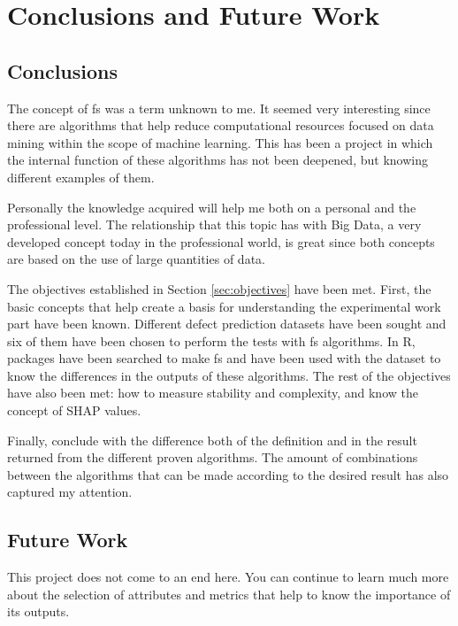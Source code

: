 \chapter{Conclusions and Future Work}
\label{cha:concl-y-line}

\section{Conclusions}
\label{sec:conclusions}

The concept of \acrlong{fs} was a term unknown to me. It seemed very interesting since there are algorithms that help reduce computational resources focused on data mining within the scope of machine learning. This has been a project in which the internal function of these algorithms has not been deepened, but knowing different examples of them.

Personally the knowledge acquired will help me both on a personal and the professional level. The relationship that this topic has with Big Data, a very developed concept today in the professional world, is great since both concepts are based on the use of large quantities of data.

The objectives established in Section \ref{sec:objectives} have been met. First, the basic concepts that help create a basis for understanding the experimental work part have been known. Different defect prediction datasets have been sought and six of them have been chosen to perform the tests with \acrlong{fs} algorithms. In R, packages have been searched to make \acrlong{fs} and have been used with the dataset to know the differences in the outputs of these algorithms. The rest of the objectives have also been met: how to measure stability and complexity, and know the concept of SHAP values.

Finally, conclude with the difference both of the definition and in the result returned from the different proven algorithms. The amount of combinations between the algorithms that can be made according to the desired result has also captured my attention.

\section{Future Work}
\label{sec:future-work}

This project does not come to an end here. You can continue to learn much more about the selection of attributes and metrics that help to know the importance of its outputs.

